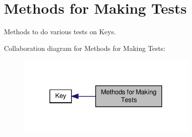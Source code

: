 \hypertarget{group__keytest}{\section{Methods for Making Tests}
\label{group__keytest}
}


Methods to do various tests on Keys.  


Collaboration diagram for Methods for Making Tests\-:
\nopagebreak
\begin{figure}[H]
\begin{center}
\leavevmode
\includegraphics[width=252pt]{group__keytest}
\end{center}
\end{figure}
